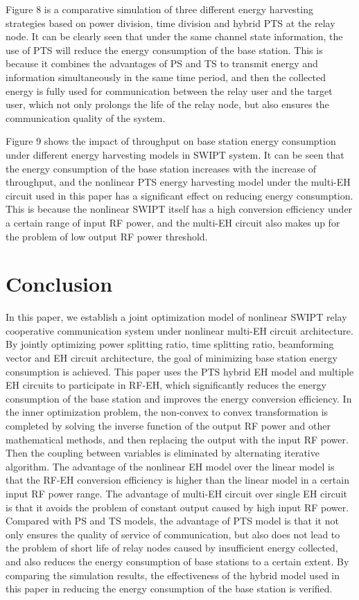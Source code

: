 \documentclass[conference]{IEEEtran}
\begin{document}
Figure 8 is a comparative simulation of three different energy harvesting strategies based on power division, time division and hybrid PTS at the relay node. It can be clearly seen that under the same channel state information, the use of PTS will reduce the energy consumption of the base station. This is because it combines the advantages of PS and TS to transmit energy and information simultaneously in the same time period, and then the collected energy is fully used for communication between the relay user and the target user, which not only prolongs the life of the relay node, but also ensures the communication quality of the system.

Figure 9 shows the impact of throughput on base station energy consumption under different energy harvesting models in SWIPT system. It can be seen that the energy consumption of the base station increases with the increase of throughput, and the nonlinear PTS energy harvesting model under the multi-EH circuit used in this paper has a significant effect on reducing energy consumption. This is because the nonlinear SWIPT itself has a high conversion efficiency under a certain range of input RF power, and the multi-EH circuit also makes up for the problem of low output RF power threshold. 

\section{Conclusion}

In this paper, we establish a joint optimization model of nonlinear SWIPT relay cooperative communication system under nonlinear multi-EH circuit architecture.
By jointly optimizing power splitting ratio, time splitting ratio, beamforming vector and EH circuit architecture, the goal of minimizing base station energy consumption is achieved.
This paper uses the PTS hybrid EH model and multiple EH circuits to participate in RF-EH, which significantly reduces the energy consumption of the base station and improves the energy conversion efficiency. 
In the inner optimization problem, the non-convex to convex transformation is completed by solving the inverse function of the output RF power and other mathematical methods, and then replacing the output with the input RF power. Then the coupling between variables is eliminated by alternating iterative algorithm.
The advantage of the nonlinear EH model over the linear model is that the RF-EH conversion efficiency is higher than the linear model in a certain input RF power range. The advantage of multi-EH circuit over single EH circuit is that it avoids the problem of constant output caused by high input RF power. Compared with PS and TS models, the advantage of PTS model is that it not only ensures the quality of service of communication, but also does not lead to the problem of short life of relay nodes caused by insufficient energy collected, and also reduces the energy consumption of base stations to a certain extent.
By comparing the simulation results, the effectiveness of the hybrid model used in this paper in reducing the energy consumption of the base station is verified.
\end{document}
